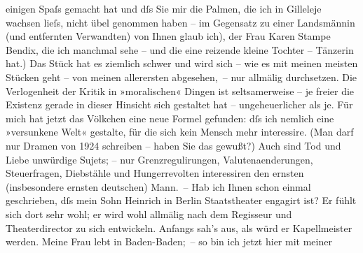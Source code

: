 \begin{ledgroupsized}[t]{13cm}
               einigen Spaſs gemacht hat und dſs Sie mir die Palmen, die ich in Gilleleje wachsen {\pb}lieſs,
               nicht übel genommen haben – \label{T_L02423_1v}\label{T_L02423_1h}im
               Gegensatz zu einer Landsmännin (und entfernten Verwandten) von Ihnen glaub ich), der
               Frau Karen Stampe Bendix, die ich manchmal sehe –
               und die eine reizende kleine Tochter – Tänzerin hat.) Das Stück hat es ziemlich schwer und wird sich – wie es mit meinen meisten
               Stücken geht – von meinen allerersten abgesehen, – nur allmälig durchsetzen. Die
               Verlogenheit der Kritik in »moralischen« Dingen ist seltsamerweise – je freier die
               Existenz gerade in dieser Hinsicht sich gestaltet hat – ungeheuerlicher als je. Für
               mich hat jetzt das Völkchen eine neue Formel gefunden: dſs ich nemlich eine
               »versunkene Welt« gestalte, für die sich kein Mensch mehr interessire. (Man darf nur
               Dramen von 1924 schreiben – haben Sie das gewußt?) Auch sind Tod und
               Liebe unwürdige Sujets; – nur Grenzregulirungen, Valutenaenderungen, Steuerfragen,
               Diebstähle und Hungerrevolten interessiren den {\pb}ernsten (insbesondere ernsten deutschen) Mann. –\pend
           \pstart
           Hab ich Ihnen schon einmal geschrieben, dſs mein Sohn Heinrich in Berlin Staatstheater engagirt
               ist? Er fühlt sich dort sehr wohl; er wird wohl allmälig nach dem Regisseur und
               Theaterdirector zu sich entwickeln. Anfangs sah's aus, als würd er Kapellmeister
               werden.\pend
           \pstart
           Meine Frau lebt in Baden-Baden; – so bin ich jetzt hier mit meiner

\end{ledgroupsized}
